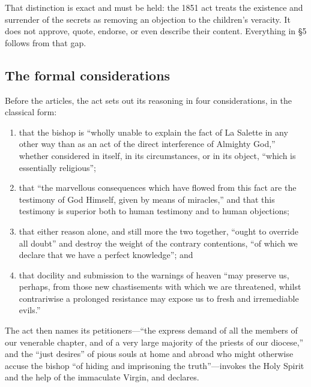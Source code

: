 That distinction is exact and must be held: the 1851 act treats the
existence and surrender of the secrets as removing an objection to
the children's veracity. It does not approve, quote, endorse, or
even describe their content. Everything in \S5 follows from that
gap.

\subsection{The formal considerations}

Before the articles, the act sets out its reasoning in four
considerations, in the classical  form:

\begin{enumerate}[leftmargin=1.4em,itemsep=0.15em,topsep=0.25em]
\item that the bishop is ``wholly unable to explain the fact of La
Salette in any other way than as an act of the direct interference
of Almighty God,'' whether considered in itself, in its
circumstances, or in its object, ``which is essentially religious'';
\item that ``the marvellous consequences which have flowed from this
fact are the testimony of God Himself, given by means of miracles,''
and that this testimony is superior both to human testimony and to
human objections;
\item that either reason alone, and still more the two together,
``ought to override all doubt'' and destroy the weight of the
contrary contentions, ``of which we declare that we have a perfect
knowledge''; and
\item that docility and submission to the warnings of heaven ``may
preserve us, perhaps, from those new chastisements with which we are
threatened, whilst contrariwise a prolonged resistance may expose us
to fresh and irremediable evils.''
\end{enumerate}

The act then names its petitioners---``the express demand of all the
members of our venerable chapter, and of a very large majority of
the priests of our diocese,'' and the ``just desires'' of pious
souls at home and abroad who might otherwise accuse the bishop ``of
hiding and imprisoning the truth''---invokes the Holy Spirit and the
help of the immaculate Virgin, and declares.

